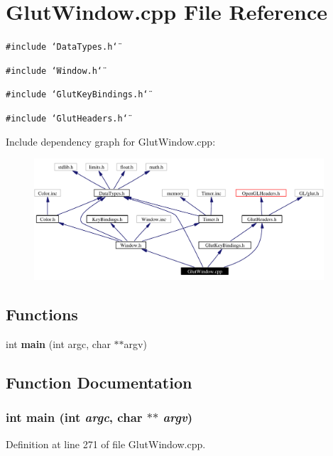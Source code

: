 \section{Glut\-Window.cpp File Reference}
\label{GlutWindow_8cpp}
{\tt \#include \char`\"{}Data\-Types.h\char`\"{}}\par
{\tt \#include \char`\"{}Window.h\char`\"{}}\par
{\tt \#include \char`\"{}Glut\-Key\-Bindings.h\char`\"{}}\par
{\tt \#include \char`\"{}Glut\-Headers.h\char`\"{}}\par


Include dependency graph for Glut\-Window.cpp:\begin{figure}[H]
\begin{center}
\leavevmode
\includegraphics[width=306pt]{GlutWindow_8cpp__incl}
\end{center}
\end{figure}
\subsection*{Functions}
\begin{CompactItemize}
\item 
int {\bf main} (int argc, char $\ast$$\ast$argv)
\end{CompactItemize}


\subsection{Function Documentation}
\subsubsection{\setlength{\rightskip}{0pt plus 5cm}int main (int {\em argc}, char $\ast$$\ast$ {\em argv})}\label{GlutWindow_8cpp_a13}




Definition at line 271 of file Glut\-Window.cpp.